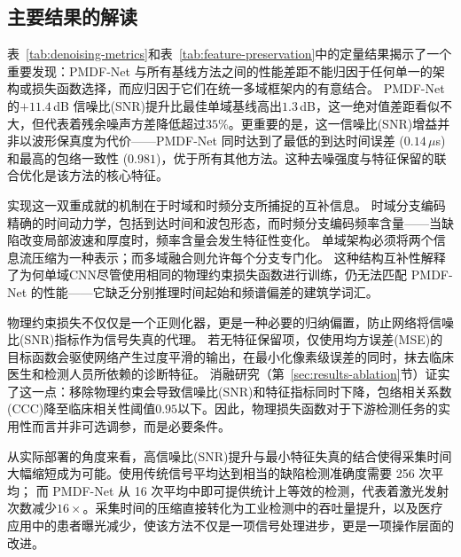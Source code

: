 \subsection{主要结果的解读}
\label{sec:discussion-interpretation}

表~\ref{tab:denoising-metrics}和表~\ref{tab:feature-preservation}中的定量结果揭示了一个重要发现：PMDF-Net 与所有基线方法之间的性能差距不能归因于任何单一的架构或损失函数选择，而应归因于它们在统一多域框架内的有意结合。
PMDF-Net 的$+11.4$\,dB 信噪比(SNR)提升比最佳单域基线高出$1.3$\,dB，这一绝对值差距看似不大，但代表着残余噪声方差降低超过$35\%$。更重要的是，这一信噪比(SNR)增益并非以波形保真度为代价——PMDF-Net 同时达到了最低的到达时间误差 ($0.14$\,$\mu$s) 和最高的包络一致性 ($0.981$)，优于所有其他方法。这种去噪强度与特征保留的联合优化是该方法的核心特征。

实现这一双重成就的机制在于时域和时频分支所捕捉的互补信息。
时域分支编码精确的时间动力学，包括到达时间和波包形态，而时频分支编码频率含量——当缺陷改变局部波速和厚度时，频率含量会发生特征性变化。
单域架构必须将两个信息流压缩为一种表示；而多域融合则允许每个分支专门化。
这种结构互补性解释了为何单域CNN尽管使用相同的物理约束损失函数进行训练，仍无法匹配 PMDF-Net 的性能——它缺乏分别推理时间起始和频谱偏差的建筑学词汇。

物理约束损失不仅仅是一个正则化器，更是一种必要的归纳偏置，防止网络将信噪比(SNR)指标作为信号失真的代理。
若无特征保留项，仅使用均方误差(MSE)的目标函数会驱使网络产生过度平滑的输出，在最小化像素级误差的同时，抹去临床医生和检测人员所依赖的诊断特征。
消融研究（第~\ref{sec:results-ablation}节）证实了这一点：移除物理约束会导致信噪比(SNR)和特征指标同时下降，包络相关系数(CCC)降至临床相关性阈值$0.95$以下。因此，物理损失函数对于下游检测任务的实用性而言并非可选调参，而是必要条件。

从实际部署的角度来看，高信噪比(SNR)提升与最小特征失真的结合使得采集时间大幅缩短成为可能。使用传统信号平均达到相当的缺陷检测准确度需要 256 次平均；
而 PMDF-Net 从 16 次平均中即可提供统计上等效的检测，代表着激光发射次数减少$16\times$。采集时间的压缩直接转化为工业检测中的吞吐量提升，以及医疗应用中的患者曝光减少，使该方法不仅是一项信号处理进步，更是一项操作层面的改进。
